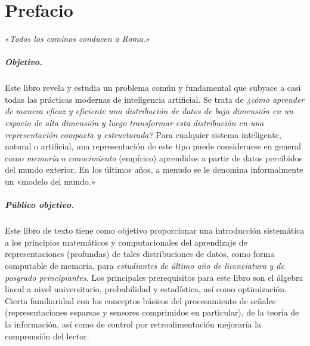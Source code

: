 \documentclass[../../book-main.tex]{subfiles}
\begin{document}
\chapter*{Prefacio}
\begin{center}
    «{\em Todos los caminos conducen a Roma}.»

\end{center}
\vspace{5mm}

\paragraph{Objetivo.}
Este libro revela y estudia un problema común y fundamental que subyace
a casi todas las prácticas modernas de inteligencia artificial.
Se trata de {\em ¿cómo aprender de manera eficaz y eficiente una
    distribución de datos de baja dimensión en un espacio de alta dimensión y
    luego transformar esta distribución en una representación compacta y 
estructurada?} Para cualquier sistema inteligente, natural o artificial,
 una representación de este tipo puede considerarse en general como {\em memoria} o
{\em conocimiento} (empírico) aprendidos a partir de datos percibidos del mundo exterior. 
En los últimos años, a menudo se le denomina informalmente un «modelo del mundo.»

\paragraph{Público objetivo.}
Este libro de texto tiene como objetivo proporcionar una introducción sistemática a los
principios matemáticos y computacionales del aprendizaje de representaciones 
(profundas) de tales distribuciones de datos, como forma computable de
memoria, para {\em estudiantes de último año de licenciatura y de posgrado principiantes}.
Los principales prerequisitos para este libro son el álgebra lineal a nivel universitario,
probabilidad y estadística, así como optimización. Cierta familiaridad con 
los conceptos básicos del procesamiento de señales (representaciones esparsas y sensores
comprimidos en particular), de la teoría de la información, así como de control por
retroalimentación mejoraría la comprensión del lector.
\end{document}
